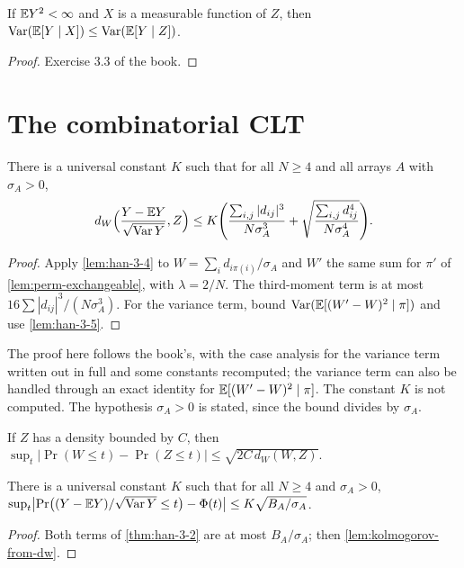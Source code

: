 \begin{lemma}
  \label{lem:han-3-5}
  If $\mathbb{E} Y^2<\infty$ and $X$ is a measurable function of $Z$, then $\operatorname{Var}(\mathbb{E}[Y\mid X])\le\operatorname{Var}(\mathbb{E}[Y\mid Z])$.
\end{lemma}
\begin{proof}
  Exercise 3.3 of the book.
\end{proof}

\section{The combinatorial CLT}

\begin{theorem}
  \label{thm:han-3-2}
  There is a universal constant $K$ such that for all $N\ge4$ and all arrays $A$ with $\sigma_A>0$,
  \[
    d_W\Bigl(\frac{Y-\mathbb{E} Y}{\sqrt{\operatorname{Var} Y}},Z\Bigr)\le K\Biggl(\frac{\sum_{i,j}|d_{ij}|^3}{N\sigma_A^3}+\sqrt{\frac{\sum_{i,j}d_{ij}^4}{N\sigma_A^4}}\Biggr).
  \]
\end{theorem}
\begin{proof}
  Apply \cref{lem:han-3-4} to $W=\sum_id_{i\pi(i)}/\sigma_A$ and $W'$ the same sum for $\pi'$ of \cref{lem:perm-exchangeable}, with $\lambda=2/N$. The third-moment term is at most $16\sum|d_{ij}|^3/(N\sigma_A^3)$. For the variance term, bound $\operatorname{Var}(\mathbb{E}[(W'-W)^2\mid\pi])$ and use \cref{lem:han-3-5}.
\end{proof}
\begin{remark}
  The proof here follows the book's, with the case analysis for the variance term written out in full and some constants recomputed; the variance term can also be handled through an exact identity for $\mathbb{E}[(W'-W)^2\mid\pi]$. The constant $K$ is not computed. The hypothesis $\sigma_A>0$ is stated, since the bound divides by $\sigma_A$.
\end{remark}

\begin{lemma}
  \label{lem:kolmogorov-from-dw}
  If $Z$ has a density bounded by $C$, then $\sup_t|\Pr(W\le t)-\Pr(Z\le t)|\le\sqrt{2C\,d_W(W,Z)}$.
\end{lemma}

\begin{corollary}
  \label{cor:han-3-3}
  There is a universal constant $K$ such that for all $N\ge4$ and $\sigma_A>0$,
  $\sup_t\bigl|\Pr\bigl((Y-\mathbb{E} Y)/\sqrt{\operatorname{Var} Y}\le t\bigr)-\Phi(t)\bigr|\le K\sqrt{B_A/\sigma_A}$.
\end{corollary}
\begin{proof}
  Both terms of \cref{thm:han-3-2} are at most $B_A/\sigma_A$; then \cref{lem:kolmogorov-from-dw}.
\end{proof}


